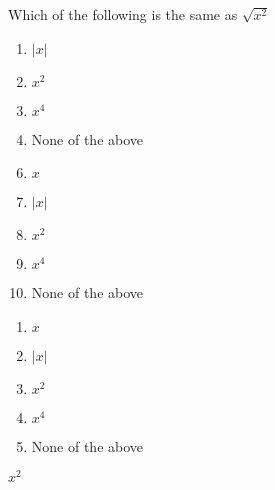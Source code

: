 




 Which of the following is the same as $\sqrt{x^{2}}$


\ifsat
	\begin{enumerate}[label=\Alph*)]
		\item  $|x|$
		\item  $x^{2}$%
		\item  $x^{4}$
		\item  None of the above
	\end{enumerate}
\else
\fi

\ifacteven
	\begin{enumerate}[label=\textbf{\Alph*.},itemsep=\fill,align=left]
		\setcounter{enumii}{5}
		\item   $x$
		\item  $|x|$
		\item  $x^{2}$%
		\addtocounter{enumii}{1}
		\item  $x^{4}$
		\item  None of the above
	\end{enumerate}
\else
\fi

\ifactodd
	\begin{enumerate}[label=\textbf{\Alph*.},itemsep=\fill,align=left]
		\item   $x$
		\item  $|x|$
		\item  $x^{2}$%
		\item  $x^{4}$
		\item  None of the above
	\end{enumerate}
\else
\fi

\ifgridin
  $x^{2}$%
		
\else
\fi

